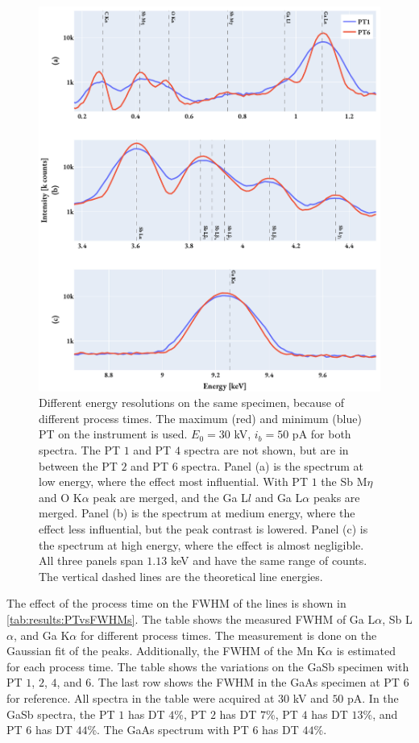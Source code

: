 \begin{figure}[hptb]
    \centering
    \includegraphics[width=0.95\linewidth]{figures/results/eds_energyResolutions_process_time.pdf}
    \caption{
        Different energy resolutions on the same specimen, because of different process times.
        The maximum (red) and minimum (blue) PT on the instrument is used.
        $E_0 = 30$ kV, $i_b = 50$ pA for both spectra.
        The PT $1$ and PT $4$ spectra are not shown, but are in between the PT $2$ and PT $6$ spectra.
        Panel (a) is the spectrum at low energy, where the effect most influential.
        With PT $1$ the Sb M$\eta$ and O K$\alpha$ peak are merged, and the Ga L$l$ and Ga L$\alpha$ peaks are merged.
        Panel (b) is the spectrum at medium energy, where the effect less influential, but the peak contrast is lowered.
        Panel (c) is the spectrum at high energy, where the effect is almost negligible.
        All three panels span $1.13$ keV and have the same range of counts.
        The vertical dashed lines are the theoretical line energies.
    }
    \label{fig:results:energy_resolutions_process_time}
\end{figure}


The effect of the process time on the FWHM of the lines is shown in \cref{tab:results:PTvsFWHMs}.
The table shows the measured FWHM of Ga L$\alpha$, Sb L$\alpha$, and Ga K$\alpha$ for different process times.
The measurement is done on the Gaussian fit of the peaks.
Additionally, the FWHM of the Mn K$\alpha$ is estimated for each process time.
The table shows the variations on the GaSb specimen with PT $1$, $2$, $4$, and $6$.
The last row shows the FWHM in the GaAs specimen at PT $6$ for reference.
All spectra in the table were acquired at $30$ kV and $50$ pA.
In the GaSb spectra, the PT $1$ has DT $4$\%, PT $2$ has DT $7$\%, PT $4$ has DT $13$\%, and PT $6$ has DT $44$\%.
The GaAs spectrum with PT $6$ has DT $44$\%.

